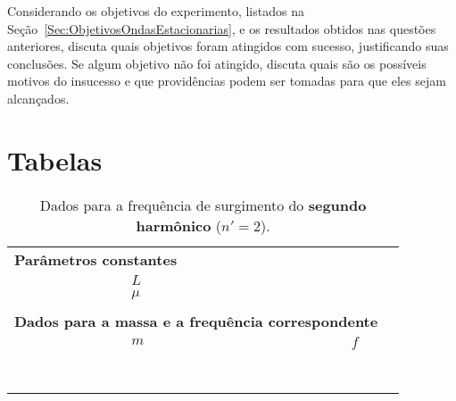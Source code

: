 
\begin{question}[type={exam}]
Considerando os objetivos do experimento, listados na Seção~\ref{Sec:ObjetivosOndasEstacionarias}, e os resultados obtidos nas questões anteriores, discuta quais objetivos foram atingidos com sucesso, justificando suas conclusões. Se algum objetivo não foi atingido, discuta quais são os possíveis motivos do insucesso e que providências podem ser tomadas para que eles sejam alcançados.
\end{question}

\clearpage
\section{Tabelas}

\begin{table}[!htb]
\caption{Dados para a frequência de surgimento do \textbf{segundo harmônico} ($n' = 2$).}
\label{Tab:FrequenciaFuncaoMassa}
	\begin{center}
		\begin{tabular}{cp{45mm}p{45mm}c}
		\toprule
\multicolumn{2}{l}{\textbf{Parâmetros constantes}}&&\\
		\cmidrule{2-3}
		& \cellcolor[gray]{0.89}$L$ &\cellcolor[gray]{0.92} \\
		& \cellcolor[gray]{0.95}$\mu$ & \cellcolor[gray]{0.97}\\
		\cmidrule{2-3}
		\\
\multicolumn{3}{l}{\textbf{Dados para a massa e a frequência correspondente}} \\
		\cmidrule{2-3}		
		& $m$ & $f$ \\
		\cmidrule{2-3}
		& \cellcolor[gray]{0.89} & \cellcolor[gray]{0.92} \\
		& \cellcolor[gray]{0.95} & \cellcolor[gray]{0.97} \\
		& \cellcolor[gray]{0.89} & \cellcolor[gray]{0.92} \\
		& \cellcolor[gray]{0.95} & \cellcolor[gray]{0.97} \\
		& \cellcolor[gray]{0.89} & \cellcolor[gray]{0.92} \\
		& \cellcolor[gray]{0.95} & \cellcolor[gray]{0.97} \\
		& \cellcolor[gray]{0.89} & \cellcolor[gray]{0.92} \\
		& \cellcolor[gray]{0.95} & \cellcolor[gray]{0.97} \\
		\cmidrule{2-3}		
		\bottomrule
		\end{tabular}
	\end{center}
\end{table}

